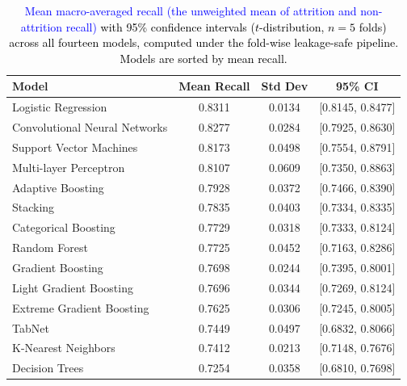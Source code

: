 \documentclass[a4paper,fleqn]{cas-sc}
\begin{document}
\begin{table}[pos=h]
\centering
\caption{\textcolor{black}{\textcolor{blue}{Mean macro-averaged recall (the unweighted mean of attrition and non-attrition recall)} with 95\% confidence intervals ($t$-distribution, $n=5$ folds) across all fourteen models, computed under the fold-wise leakage-safe pipeline. Models are sorted by mean recall.}}
\label{tab:recall_ci}
\begin{tabular}{lccc}
\toprule
\textbf{Model} & \textbf{Mean Recall} & \textbf{Std Dev} & \textbf{95\% CI} \\
\midrule
Logistic Regression & 0.8311 & 0.0134 & [0.8145, 0.8477] \\
Convolutional Neural Networks & 0.8277 & 0.0284 & [0.7925, 0.8630] \\
Support Vector Machines & 0.8173 & 0.0498 & [0.7554, 0.8791] \\
Multi-layer Perceptron & 0.8107 & 0.0609 & [0.7350, 0.8863] \\
Adaptive Boosting & 0.7928 & 0.0372 & [0.7466, 0.8390] \\
Stacking & 0.7835 & 0.0403 & [0.7334, 0.8335] \\
Categorical Boosting & 0.7729 & 0.0318 & [0.7333, 0.8124] \\
Random Forest & 0.7725 & 0.0452 & [0.7163, 0.8286] \\
Gradient Boosting & 0.7698 & 0.0244 & [0.7395, 0.8001] \\
Light Gradient Boosting & 0.7696 & 0.0344 & [0.7269, 0.8124] \\
Extreme Gradient Boosting & 0.7625 & 0.0306 & [0.7245, 0.8005] \\
TabNet & 0.7449 & 0.0497 & [0.6832, 0.8066] \\
K-Nearest Neighbors & 0.7412 & 0.0213 & [0.7148, 0.7676] \\
Decision Trees & 0.7254 & 0.0358 & [0.6810, 0.7698] \\
\bottomrule
\end{tabular}
\end{table}
\end{document}
